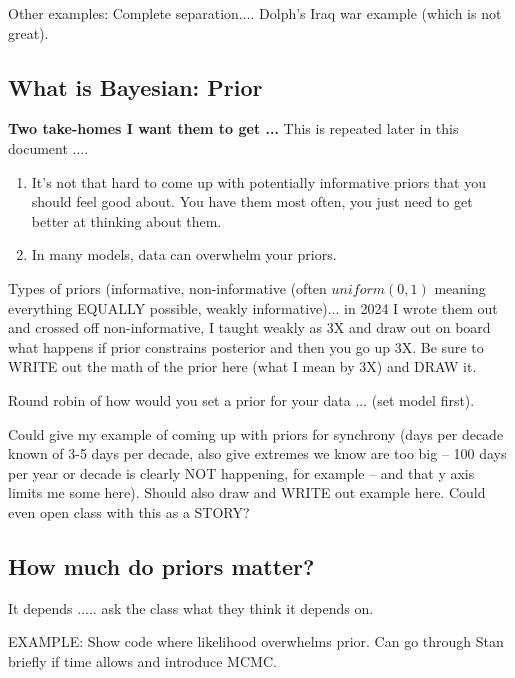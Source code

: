 \documentclass[11pt]{article}
\begin{document}
Other examples: Complete separation.... Dolph's Iraq war example (which is not great).

\subsection{What is Bayesian: Prior}


{\bf Two take-homes I want them to get ...} This is repeated later in this document ....
\begin{enumerate}
\item It's not that hard to come up with potentially informative priors that you should feel good about. You have them most often, you just need to get better at thinking about them.
\item In many models, data can overwhelm your priors. 
\end{enumerate}

Types of priors (informative, non-informative (often $uniform(0,1)$ meaning everything EQUALLY possible, weakly informative)... in 2024 I wrote them out and crossed off non-informative, I taught weakly as 3X and draw out on board what happens if prior constrains posterior and then you go up 3X. Be sure to WRITE out the math of the prior here (what I mean by 3X) and DRAW it. 

Round robin of how would you set a prior for your data ... (set model first).

Could give my example of coming up with priors for synchrony (days per decade known of 3-5 days per decade, also give extremes we know are too big -- 100 days per year or decade is clearly NOT happening, for example -- and that y axis limits me some here).  Should also draw and WRITE out example here. Could even open class with this as a STORY?

\subsection{How much do priors matter?}
It depends ..... ask the class what they think it depends on.


EXAMPLE: Show code where likelihood overwhelms prior. Can go through Stan briefly if time allows and introduce MCMC. 
\end{document}
